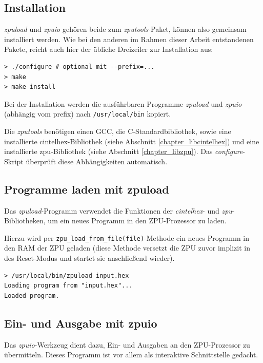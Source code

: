 \documentclass[11pt]{scrartcl}
\begin{document}
\subsection{Installation}

\emph{zpuload} und \emph{zpuio} gehören beide zum \emph{zputools}-Paket, können also gemeinsam installiert werden. Wie bei den anderen im Rahmen dieser Arbeit entstandenen Pakete, reicht auch hier der übliche Dreizeiler zur Installation aus:

\begin{lstlisting}[caption=Installation der zputools-Werkzeuge]
> ./configure # optional mit --prefix=...
> make
> make install
\end{lstlisting}

Bei der Installation werden die ausführbaren Programme \emph{zpuload} und \emph{zpuio} (abhängig vom prefix) nach \texttt{/usr/local/bin} kopiert.

Die \emph{zputools} benötigen einen GCC, die C-Standardbibliothek, sowie eine installierte cintelhex-Bibliothek (siehe Abschnitt \ref{chapter_libcintelhex}) und eine installierte zpu-Bibliothek (siehe Abschnitt \ref{chapter_libzpu}). Das \emph{configure}-Skript überprüft diese Abhängigkeiten automatisch.

\subsection{Programme laden mit zpuload}

Das \emph{zpuload}-Programm verwendet die Funktionen der \emph{cintelhex}- und \emph{zpu}-Bibliotheken, um ein neues Programm in den ZPU-Prozessor zu laden.

Hierzu wird per \texttt{zpu\_load\_from\_file(file)}-Methode ein neues Programm in den RAM der ZPU geladen (diese Methode versetzt die ZPU zuvor implizit in des Reset-Modus und startet sie anschließend wieder).

\begin{lstlisting}[caption=Verwendung des zpuload-Werkzeugs]
> /usr/local/bin/zpuload input.hex
Loading program from "input.hex"...
Loaded program.
\end{lstlisting}

\subsection{Ein- und Ausgabe mit zpuio}

Das \emph{zpuio}-Werkzeug dient dazu, Ein- und Ausgaben an den ZPU-Prozessor zu übermitteln. Dieses Programm ist vor allem als interaktive Schnittstelle gedacht.
\end{document}
